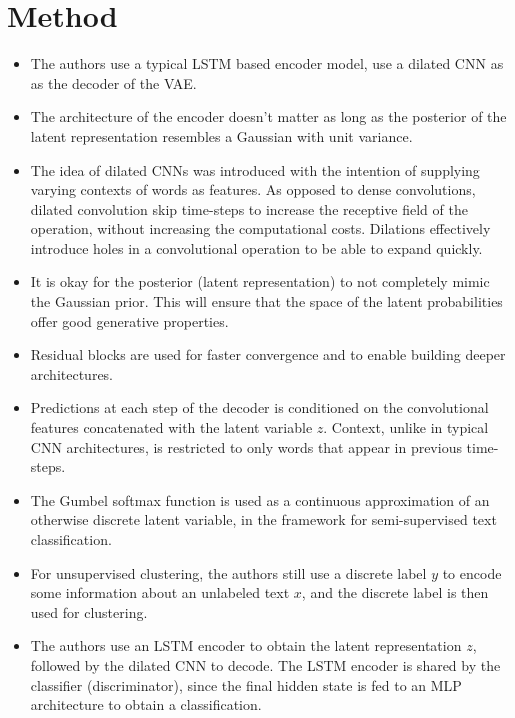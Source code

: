 \documentclass[12pt]{scrartcl}
\begin{document}
\section{Method}
  \begin{itemize}
    \item The authors use a typical LSTM based encoder model, use a dilated CNN as as the decoder of the VAE.
    \item The architecture of the encoder doesn't matter as long as the posterior of the latent representation resembles a Gaussian with unit variance.
    \item The idea of dilated CNNs was introduced with the intention of supplying varying contexts of words as features. As opposed to dense convolutions, dilated convolution skip time-steps to increase the receptive field of the operation, without increasing the computational costs. Dilations effectively introduce holes in a convolutional operation to be able to expand quickly.
    \item It is okay for the posterior (latent representation) to not completely mimic the Gaussian prior. This will ensure that the space of the latent probabilities offer good generative properties.
    \item Residual blocks are used for faster convergence and to enable building deeper architectures.
    \item Predictions at each step of the decoder is conditioned on the convolutional features concatenated with the latent variable $z$. Context, unlike in typical CNN architectures, is restricted to only words that appear in previous time-steps.
    \item The Gumbel softmax function is used as a continuous approximation of an otherwise discrete latent variable, in the framework for semi-supervised text classification.
    \item For unsupervised clustering, the authors still use a discrete label $y$ to encode some information about an unlabeled text $x$, and the discrete label is then used for clustering.
    \item The authors use an LSTM encoder to obtain the latent representation $z$, followed by the dilated CNN to decode. The LSTM encoder is shared by the classifier (discriminator), since the final hidden state is fed to an MLP architecture to obtain a classification.
  \end{itemize}
\end{document}
